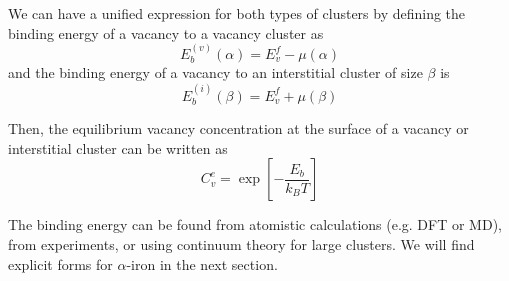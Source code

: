 \documentclass[pdflatex,sn-basic]{sn-jnl} %
\begin{document}
We can have a unified expression for both types of clusters by defining the binding energy of a vacancy to a vacancy cluster as
\begin{equation}
    E_b^{(v)}(\alpha)=E_v^f-\mu(\alpha)
        \label{eq:v_binding}
\end{equation}
\noindent and the binding energy of a vacancy to an interstitial cluster of size $\beta$ is
\begin{equation}
    E_b^{(i)}(\beta)=E_v^f+\mu(\beta)
    \label{eq:i_binding}
\end{equation}

Then, the equilibrium vacancy concentration at the surface of a vacancy or interstitial cluster can be written as
\begin{equation}
    C_v^e  = \exp\left[-\frac{E_b}{k_BT}\right]
\end{equation}

The binding energy can be found from atomistic calculations (e.g. DFT or MD), from experiments, or using continuum theory for large clusters. We will find explicit forms for $\alpha$-iron in the next section.
\end{document}
